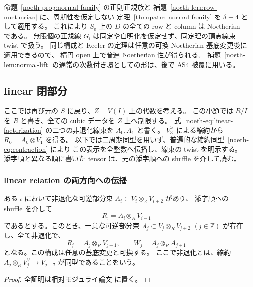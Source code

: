 命題~\ref{noeth-prop:normal-family} の正則正規族と
補題~\ref{noeth-lem:row-noetherian} に、周期性を仮定しない
定理~\ref{thm:patch-normal-family} を $\delta=4$ として適用する。
これにより $S_{\mathrm e}$ 上の $D$ の全ての row と column は Noetherian である。
無限個の正規線 $G_i$ は同定や自明化を仮定せず、同定理の頂点線束 twist で扱う。
同じ構成と Keeler の定理は任意の可換 Noetherian 基底変更後に適用できるので、
楕円 open 上で普遍 Noetherian 性が得られる。
補題~\ref{noeth-lem:normal-lift} の通常の次数付き環としての形は、後で AS4 被覆に用いる。

\subsection{linear 閉部分}

ここでは再び元の $S$ に戻り、$Z=V(I)$ 上の代数を考える。
この小節では $R/I$ を $R$ と書き、全ての cubic データを $Z$ 上へ制限する。
式~\eqref{noeth-eq:linear-factorization} の二つの非退化線束を $A_0,A_1$ と書く。
$V_3^\vee$ による縮約から $R_0=A_0\otimes V_1$ を得る。
以下では二周期同型を用いず、普遍的な縮約同型~\eqref{noeth-eq:contraction} により
この表示を全整数へ伝播し、線束の twist を明示する。
添字順と異なる順に書いた tensor は、元の添字順への shuffle を介して読む。

\subsubsection{linear relation の両方向への伝播}

\begin{lemma}[一つの線型関係からの伝播]
\label{lem:linear-propagation-without-period}
ある $i$ において非退化な可逆部分束
$A_i\subset V_i\otimes_R V_{i+2}$ があり、
添字順への shuffle を介して
\[
 R_i=A_i\otimes_R V_{i+1}
\]
であるとする。このとき、一意な可逆部分束
$A_j\subset V_j\otimes_R V_{j+2}$ $(j\in\mathbb Z)$ が存在し、全て非退化で、
\begin{equation}\label{eq:linear-all-relations}
 R_j=A_j\otimes_R V_{j+1},\qquad
 W_j=A_j\otimes_R A_{j+1}
\end{equation}
となる。この構成は任意の基底変更と可換する。
ここで非退化とは、縮約
$A_j\otimes_R V_j^\vee\to V_{j+2}$ が同型であることをいう。
\end{lemma}

\begin{proof}
全証明は相対モジュライ論文 \cite[\texttt{relative_cubic_noetherian}]{QuadricModuli2026} に置く。
\end{proof}

